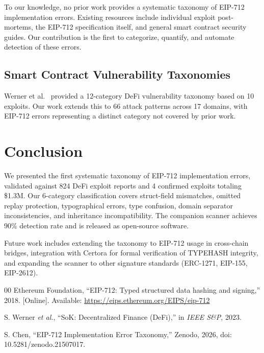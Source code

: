 \documentclass[conference]{IEEEtran}
\begin{document}
To our knowledge, no prior work provides a systematic taxonomy of EIP-712 implementation errors. Existing resources include individual exploit post-mortems, the EIP-712 specification itself, and general smart contract security guides. Our contribution is the first to categorize, quantify, and automate detection of these errors.

\subsection{Smart Contract Vulnerability Taxonomies}

Werner et al.~\cite{werner2023} provided a 12-category DeFi vulnerability taxonomy based on 10 exploits. Our work extends this to 66 attack patterns across 17 domains, with EIP-712 errors representing a distinct category not covered by prior work.

\section{Conclusion}

We presented the first systematic taxonomy of EIP-712 implementation errors, validated against 824 DeFi exploit reports and 4 confirmed exploits totaling \$1.3M. Our 6-category classification covers struct-field mismatches, omitted replay protection, typographical errors, type confusion, domain separator inconsistencies, and inheritance incompatibility. The companion scanner achieves 90\% detection rate and is released as open-source software.

Future work includes extending the taxonomy to EIP-712 usage in cross-chain bridges, integration with Certora for formal verification of TYPEHASH integrity, and expanding the scanner to other signature standards (ERC-1271, EIP-155, EIP-2612).

\begin{thebibliography}{00}
Ethereum Foundation, ``EIP-712: Typed structured data hashing and signing,'' 2018. [Online]. Available: \url{https://eips.ethereum.org/EIPS/eip-712}

S. Werner \textit{et al.}, ``SoK: Decentralized Finance (DeFi),'' in \textit{IEEE S\&P}, 2023.

S. Chen, ``EIP-712 Implementation Error Taxonomy,'' Zenodo, 2026, doi: 10.5281/zenodo.21507017.
\end{thebibliography}
\end{document}
